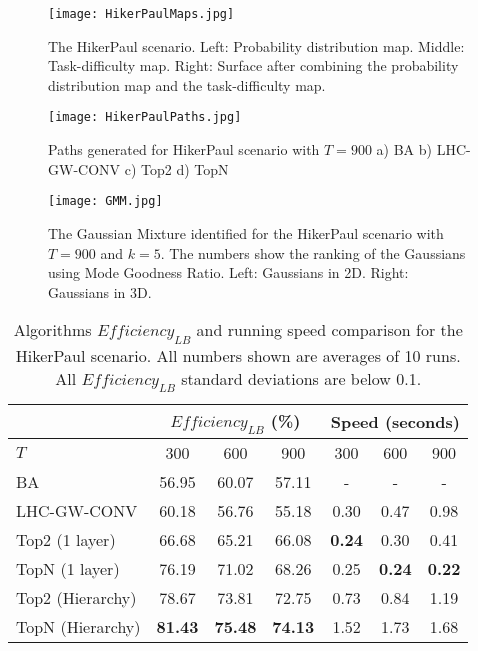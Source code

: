 \begin{figure}
\centering
\texttt{[image: HikerPaulMaps.jpg]}
\caption[The HikerPaul scenario]{The HikerPaul scenario. Left: Probability distribution map. Middle: Task-difficulty map. Right: Surface after combining the probability distribution map and the task-difficulty map.}
\label{HikerPaulMaps}
\end{figure}
\begin{figure}
\centering
\texttt{[image: HikerPaulPaths.jpg]}
\caption[Paths generated for HikerPaul scenario with $T=900$]{Paths generated for HikerPaul scenario with $T=900$ a) BA b) LHC-GW-CONV c) Top2 d) TopN}
\label{HikerPaulPaths}
\end{figure}
\begin{figure}
\centering
\texttt{[image: GMM.jpg]}
\caption[The Gaussian Mixture identified for the HikerPaul scenario]{The Gaussian Mixture identified for the HikerPaul scenario with $T=900$ and $k=5$. The numbers show the ranking of the Gaussians using Mode Goodness Ratio. Left: Gaussians in 2D. Right: Gaussians in 3D.}
\label{GMMRanking}
\end{figure}
\begin{table}
\caption[Algorithms $\mathit{Efficiency_{LB}}$ and running speed comparison for the HikerPaul scenario]{Algorithms $\mathit{Efficiency_{LB}}$ and running speed comparison for the HikerPaul scenario. All numbers shown are averages of 10 runs. All $\mathit{Efficiency_{LB}}$ standard deviations are below 0.1.}
	\centering
		\begin{tabular}
			{|l|c|c|c|c|c|c|}
			\hline
			 & \multicolumn{3}{|c|}{$\mathit{Efficiency_{LB}}$ (\%)} & \multicolumn{3}{|c|}{Speed (seconds)} \\
			\hline
			$T$ & 300 & 600 & 900	& 300 & 600 & 900 \\
			\hline
			BA & 56.95 & 60.07 & 57.11 & - & - & - \\
			\hline			
			LHC-GW-CONV & 60.18 & 56.76 & 55.18 & 0.30 & 0.47 & 0.98 \\
			\hline			
			Top2 (1 layer)	& 66.68 & 65.21 & 66.08 & \textbf{0.24} & 0.30 & 0.41 \\ 
			\hline
			TopN (1 layer)	& 76.19 & 71.02 & 68.26 & 0.25 & \textbf{0.24} & \textbf{0.22} \\ 
			\hline
			Top2 (Hierarchy) & 78.67 & 73.81 & 72.75 & 0.73 & 0.84 & 1.19 \\ 
			\hline
			TopN (Hierarchy) & \textbf{81.43} & \textbf{75.48} & \textbf{74.13} & 1.52 & 1.73 & 1.68 \\ 
			\hline			
		\end{tabular}
\label{HikerPaul}
\end{table}

